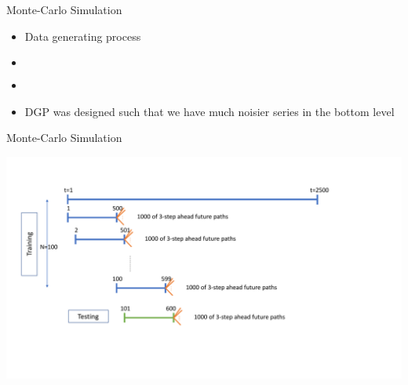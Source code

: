 \documentclass[11pt,xcolor=dvipsnames,handout]{beamer} %
\begin{document}
\begin{frame}{Monte-Carlo Simulation}
\begin{itemize}
	\item Data generating process
	\item[] 
	\begin{columns}
		\centering
		\begin{figure}
			\begin{center}
				  
				\qobitree
			\end{center}
		\end{figure}
		
		\begin{figure}
			\begin{center}
				  
				 
				\qobitree
			\end{center}
		\end{figure}
	\end{columns} 
	\item[]
	\item DGP was designed such that we have much noisier series in the bottom level
	
\end{itemize}
\end{frame}


\begin{frame}{Monte-Carlo Simulation}

\includegraphics[scale=0.4]{Figs/Optimisation_TestingG.pdf}

\end{frame}

\end{document}
